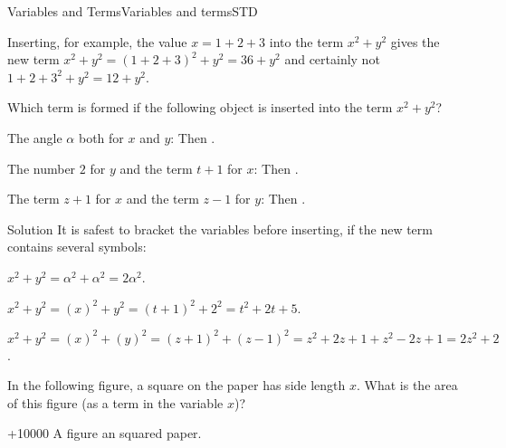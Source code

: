 \begin{MXContent}{Variables and Terms}{Variables and terms}{STD}
\begin{MExample}
Inserting, for example, the value $x=1+2+3$ into the term $x^2+y^2$ gives the new term 
$x^2+y^2=(1+2+3)^2+y^2=36+y^2$ and certainly not $1+2+3^2+y^2=12+y^2$.
\end{MExample}

\begin{MExercise}
Which term is formed if the following object is inserted into the term $x^2+y^2$?
\begin{MExerciseItems}
\item{The angle $\alpha$ both for $x$ and $y$: Then .}
\item{The number $2$ for $y$ and the term $t+1$ for $x$: Then .}
\item{The term $z+1$ for $x$ and the term $z-1$ for $y$: Then .}
\end{MExerciseItems}

\begin{MHint}{Solution}
It is safest to bracket the variables before inserting, if the new term contains several symbols:
\begin{MExerciseItems}
\item{$x^2+y^2=\alpha^2+\alpha^2=2\alpha^2$.}
\item{$x^2+y^2=(x)^2+y^2=(t+1)^2+2^2=t^2+2t+5$.}
\item{$x^2+y^2=(x)^2+(y)^2=(z+1)^2+(z-1)^2=z^2+2z+1+z^2-2z+1=2z^2+2$.}
\end{MExerciseItems}
\end{MHint}
\end{MExercise}

\begin{MExercise}
In the following figure, a square on the paper has side length $x$. What is the area of this figure (as a term in the variable $x$)?

\begin{center}
\par\ifttm\else\penalty+10000\fi
A figure an squared paper.
\end{center}


\end{MExercise}
\end{MXContent}
